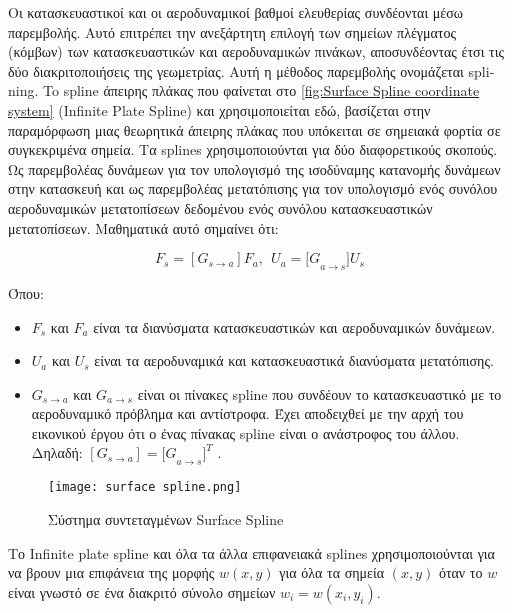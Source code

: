   Οι  κατασκευαστικοί και οι αεροδυναμικοί βαθμοί ελευθερίας συνδέονται μέσω παρεμβολής. Αυτό επιτρέπει την ανεξάρτητη επιλογή των σημείων πλέγματος (κόμβων) των κατασκευαστικών και αεροδυναμικών πινάκων, αποσυνδέοντας έτσι τις δύο διακριτοποιήσεις της γεωμετρίας. Αυτή η μέθοδος παρεμβολής ονομάζεται \textlatin{splining}. To \textlatin{spline} άπειρης πλάκας που φαίνεται στο \autoref{fig:Surface Spline coordinate system} (\textlatin{Infinite Plate Spline}) και χρησιμοποιείται εδώ, βασίζεται στην παραμόρφωση μιας θεωρητικά άπειρης πλάκας που υπόκειται σε σημειακά φορτία σε συγκεκριμένα σημεία. Τα \textlatin{splines} χρησιμοποιούνται για δύο διαφορετικούς σκοπούς. Ως παρεμβολέας δυνάμεων για τον υπολογισμό της ισοδύναμης κατανομής δυνάμεων στην κατασκευή και ως παρεμβολέας μετατόπισης για τον υπολογισμό ενός συνόλου αεροδυναμικών μετατοπίσεων δεδομένου ενός συνόλου κατασκευαστικών μετατοπίσεων. Μαθηματικά αυτό σημαίνει ότι:
  
  

\begin{equation}
F_{s} = \left\lbrack G_{s \rightarrow a} \right\rbrack F_{a},\ \ U_{a} = {\lbrack G}_{a \rightarrow s}\rbrack U_{s}
\end{equation}


Όπου:

\begin{itemize}
  \item
    $F_{s}$ και $F_{a}$ είναι τα διανύσματα κατασκευαστικών και αεροδυναμικών δυνάμεων.
  \item
    $U_{a}$ και $U_{s}$ είναι τα αεροδυναμικά και κατασκευαστικά διανύσματα μετατόπισης.
  \item
    $G_{s \rightarrow a}$ και $G_{a \rightarrow s}$ είναι οι πίνακες \textlatin{spline} που συνδέουν το κατασκευαστικό με το αεροδυναμικό πρόβλημα και αντίστροφα. Έχει αποδειχθεί με την αρχή του εικονικού έργου ότι ο ένας πίνακας \textlatin{spline} είναι ο ανάστροφος του άλλου. Δηλαδή: 
    $\left\lbrack G_{s \rightarrow a} \right\rbrack = {{\lbrack G}_{a \rightarrow s}\rbrack}^{T}$ .
  \end{itemize}

\begin{figure}[H]
  \centering
  \texttt{[image: surface spline.png]}
  \caption{Σύστημα συντεταγμένων \textlatin{Surface Spline} \cite{msc2021}}
  \label{fig:Surface Spline coordinate system}
\end{figure}

Το \textlatin{Infinite plate spline} και όλα τα άλλα επιφανειακά \textlatin{splines} χρησιμοποιούνται για να βρουν μια επιφάνεια της μορφής $w(x,y)$ για όλα τα σημεία $(x,y)$ όταν το $w$ είναι
γνωστό σε ένα διακριτό σύνολο σημείων $w_{i} = w\left( x_{i},y_{i} \right)$.

